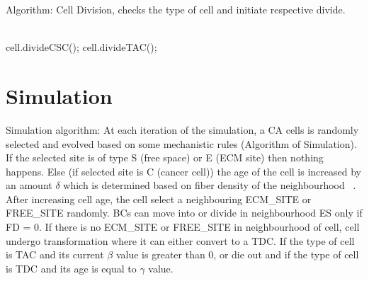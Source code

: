 \noindent Algorithm: Cell Division, checks the type of cell and initiate respective divide.\\\

\begin{algorithm}[H]
     \SetAlgoLined
     
	\begin{algorithmic}
		\STATE cell.divideCSC();
		\STATE cell.divideTAC();
	      \ENDIF
	\end{algorithmic}
		    
\end{algorithm}


\section{Simulation}

Simulation algorithm: At each iteration of the simulation, 
a CA cells is randomly selected and evolved based on some mechanistic rules (Algorithm of Simulation). 
If the selected site is of type S (free space) or E (ECM site) then nothing happens. 
Else (if selected site is C (cancer cell)) the age of the cell is increased by an amount $\delta$ which is determined based on fiber density of the neighbourhood ~\cite{klein2009, ulrich2009}. 
After increasing cell age, the cell select a neighbouring ECM\_SITE or FREE\_SITE randomly. 
BCs can move into or divide in neighbourhood ES only if FD = 0. 
If there is no ECM\_SITE or FREE\_SITE in neighbourhood of cell, 
cell undergo transformation where it can either convert to a TDC. If the type of cell is TAC and its current $\beta$ value is greater than 0, 
or die out and if the type of cell is TDC and its age is equal to $\gamma$ value.\\\

